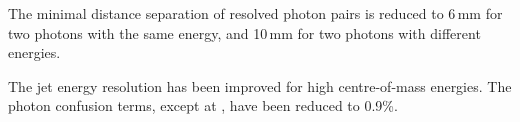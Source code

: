 The minimal distance separation of resolved photon pairs is reduced to 6\,mm for two photons with the same energy, and 10\,mm for two photons with different energies.

The jet energy resolution has been improved for high centre-of-mass energies. The photon confusion terms, except at , have been reduced to 0.9\%.


